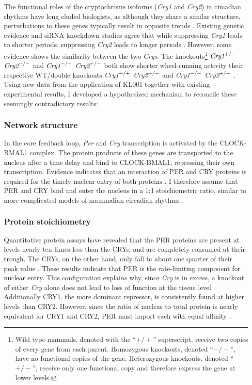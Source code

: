 The functional roles of the cryptochrome isoforms ({\it Cry1} and {\it Cry2}) in circadian rhythms have long eluded biologists, as although they share a similar structure, perturbations to these genes typically result in opposite trends \cite{McCarthy2009}.
Existing genetic evidence and siRNA knockdown studies agree that while suppressing {\it Cry1} leads to shorter periods, suppressing {\it Cry2} leads to longer periods \cite{VanderHorst1999, Zhang2009}.
However, some evidence shows the similarity between the two {\it Crys}.
The knockouts\footnote{Wild type mammals, denoted with the ``$+/+$'' superscript, receive two copies of every gene from each parent. Homozygous knockouts, denoted ``$-/-$'', have no functional copies of the gene. Heterozygous knockouts, denoted ``$+/-$'', receive only one functional copy and therefore express the gene at lower levels.} $\text{\it Cry1}^{+/-}$ $\text{\it Cry2}^{-/-}$ and $\text{\it Cry1}^{-/-}$ $\text{\it Cry2}^{+/-}$ both show shorter wheel-running activity their respective WT/double knockouts $\text{\it Cry1}^{+/+}$ $\text{\it Cry2}^{-/-}$ and $\text{\it Cry1}^{-/-}$ $\text{\it Cry2}^{+/+}$ \cite{VanderHorst1999}.
Using new data from the application of KL001 together with existing experimental results, I developed a hypothesized mechanism to reconcile these seemingly contradictory results:

\subsubsection{Network structure}
In the core feedback loop, {\itshape Per} and {\itshape Cry} transcription is activated by the CLOCK-BMAL1 complex.
The protein products of these genes are transported to the nucleus after a time delay and bind to CLOCK-BMAL1, repressing their own transcription.
Evidence indicates that an interaction of PER and CRY proteins is required for the timely nuclear entry of both proteins \cite{Miyazaki2001,Ko2006,Kume1999}.
I therefore assume that PER and CRY bind and enter the nucleus in a 1:1 stoichiometric ratio, similar to more complicated models of mammalian circadian rhythms \cite{Leloup2003,Mirsky2009,Forger2003}.

\subsubsection{Protein stoichiometry}
Quantitative protein assays have revealed that the PER proteins are present at levels nearly ten times less than the CRYs, and are completely consumed at their trough.
The CRYs, on the other hand, only fall to about one quarter of their peak value  \cite{Lee2001}.
These results indicate that PER is the rate-limiting component for nuclear entry.
This configuration explains why, since {\itshape Cry} is in excess, a knockout of either {\it Cry} alone does not lead to loss of function at the tissue level.
Additionally CRY1, the more dominant repressor, is consistently found at higher levels than CRY2.
However, since the ratio of nuclear to total protein is nearly equivalent for CRY1 and CRY2, PER must import each with equal affinity \cite{Lee2001,Lee2011b}.

